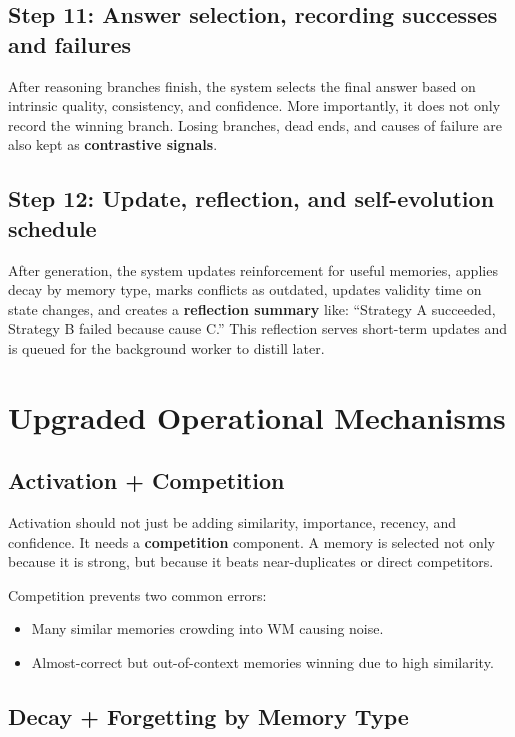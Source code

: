 \documentclass[a4paper,12pt]{article}
\begin{document}
\subsection*{Step 11: Answer selection, recording successes and failures}

After reasoning branches finish, the system selects the final answer based on intrinsic quality, consistency, and confidence. More importantly, it does not only record the winning branch. Losing branches, dead ends, and causes of failure are also kept as \textbf{contrastive signals}.

\subsection*{Step 12: Update, reflection, and self-evolution schedule}

After generation, the system updates reinforcement for useful memories, applies decay by memory type, marks conflicts as outdated, updates validity time on state changes, and creates a \textbf{reflection summary} like: ``Strategy A succeeded, Strategy B failed because cause C.'' This reflection serves short-term updates and is queued for the background worker to distill later.

\section{Upgraded Operational Mechanisms}

\subsection*{Activation + Competition}

Activation should not just be adding similarity, importance, recency, and confidence. It needs a \textbf{competition} component. A memory is selected not only because it is strong, but because it beats near-duplicates or direct competitors.

Competition prevents two common errors:
\begin{itemize}
    \item Many similar memories crowding into WM causing noise.
    \item Almost-correct but out-of-context memories winning due to high similarity.
\end{itemize}

\subsection*{Decay + Forgetting by Memory Type}
\end{document}
